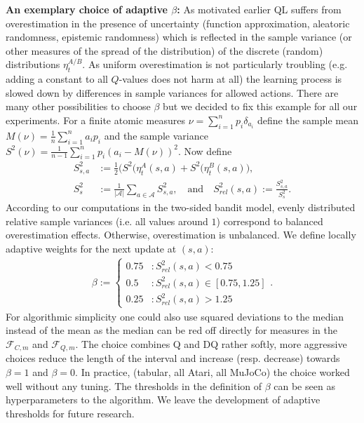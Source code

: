 \documentclass{article}
\theoremstyle{plain}
\theoremstyle{definition}
\theoremstyle{remark}
\begin{document}
\textbf{An exemplary choice of adaptive $\beta$:} As motivated earlier QL suffers from overestimation in the presence of uncertainty (function approximation, aleatoric randomness, epistemic randomness) which is reflected in the sample variance (or other measures of the spread of the distribution) of the discrete (random) distributions $\eta^{A/B}_t$. As uniform overestimation is not particularly troubling (e.g. adding a constant to all $Q$-values does not harm at all) the learning process is slowed down by differences in sample variances for allowed actions. There are many other possibilities to choose $\beta$ but we decided to fix this example for all our experiments. For a finite atomic measures $\nu=\sum_{i=1}^n p_i \delta_{a_i}$ define the sample mean $M(\nu)=\frac{1}{n}\sum_{i=1}^n a_ip_i$ and the sample variance $S^2(\nu)=\frac{1}{n-1}\sum_{i=1}^n p_i (a_i- M(\nu))^2$. Now define
\begin{align*}
    S^2_{s,a}&:=\frac{1}{2}\big(S^2(\eta_t^A(s,a)+S^2(\eta_t^B(s,a)\big),\\
    S^2_s&:=\frac{1}{|\mathcal A|}\sum_{a\in \mathcal A}S^2_{s,a},\quad\text{and}\quad
    S^2_{rel}(s,a) := \frac{S^2_{s,a}}{S^2_{s}}.
\end{align*}
According to our computations in the two-sided bandit model, evenly distributed relative sample variances (i.e. all values around $1$) correspond to balanced overestimation effects. Otherwise, overestimation is unbalanced. We define
%
locally adaptive weights for the next update at $(s,a)$:
\begin{align}\label{adap_rule}
         \beta:= 
        \begin{cases}
        0.75&: S^2_{rel}(s,a) < 0.75 \\
        0.5&: S^2_{rel}(s,a) \in [0.75,1.25] \\
        0.25&: S^2_{rel}(s,a) > 1.25
        \end{cases}.
    \end{align}
    For algorithmic simplicity one could also use squared deviations to the median instead of the mean as the median can be red off directly for measures in the $\mathcal F_{C,m}$ and $\mathcal F_{Q,m}$. The choice combines Q and DQ rather softly, more aggressive choices reduce the length of the interval and increase (resp. decrease) towards $\beta=1$ and $\beta=0$. In practice, (tabular, all Atari, all MuJoCo) the choice worked well without any tuning. The thresholds in the definition of $\beta$ can be seen as hyperparameters to the algorithm. We leave the development of adaptive thresholds for future research.
\end{document}
